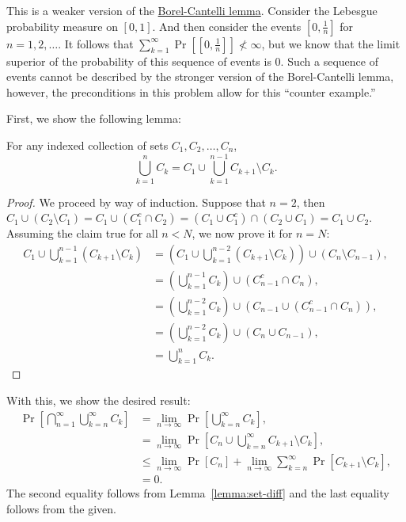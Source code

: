 \begin{solution}
    This is a weaker version of the \href{https://en.wikipedia.org/wiki/Borel-Cantelli_lemma}{Borel-Cantelli lemma}. Consider the Lebesgue probability measure on $[0,1]$. And then consider the events $\left[0,\frac{1}{n}\right]$ for $n = 1,2,\ldots$. It follows that $\sum_{k=1}^\infty \Pr\left[\left[0,\frac{1}{n}\right]\right] \not < \infty$, but we know that the limit superior of the probability of this sequence of events is 0. Such a sequence of events cannot be described by the stronger version of the Borel-Cantelli lemma, however, the preconditions in this problem allow for this ``counter example.''

    First, we show the following lemma:
    \begin{lemma}\label{lemma:set-diff}
        For any indexed collection of sets $C_1,C_2,\ldots,C_n$, \[
            \bigcup_{k=1}^n C_k = C_1 \cup \bigcup_{k=1}^{n-1} C_{k+1} \setminus C_k.  
        \]
    \end{lemma}
    \begin{proof}
        We proceed by way of induction. Suppose that $n=2$, then $C_1 \cup (C_2 \setminus C_1) = C_1 \cup (C_1^c \cap C_2) = (C_1 \cup C_1^c) \cap (C_2 \cup C_1) = C_1 \cup C_2$. Assuming the claim true for all $n < N$, we now prove it for $n=N$:
        \begin{align*}
            C_1 \cup \bigcup_{k=1}^{n-1} (C_{k+1} \setminus C_k) &= \left(C_1 \cup \bigcup_{k=1}^{n-2} (C_{k+1} \setminus C_k)\right)\cup (C_n\setminus C_{n-1}), \\
            &= \left(\bigcup_{k=1}^{n-1} C_k \right) \cup (C_{n-1}^c \cap C_n), \tag{by ind. hyp.}\\
            &= \left(\bigcup_{k=1}^{n-2} C_k\right) \cup \left(C_{n-1} \cup (C_{n-1}^c \cap C_n)\right), \\
            &= \left(\bigcup_{k=1}^{n-2} C_k\right) \cup (C_n \cup C_{n-1}), \\
            &= \bigcup_{k=1}^n C_k.
        \end{align*}
    \end{proof}
    With this, we show the desired result:
    \begin{align*}
        \Pr\left[\bigcap_{n=1}^\infty \bigcup_{k=n}^\infty C_k\right] &= \lim_{n\to\infty} \Pr\left[\bigcup_{k=n}^\infty C_k\right], \\
        &= \lim_{n\to\infty} \Pr\left[C_n \cup \bigcup_{k=n}^\infty C_{k+1} \setminus C_k\right], \\
        &\leq \lim_{n\to\infty} \Pr[C_n] + \lim_{n\to\infty} \sum_{k=n}^\infty \Pr[C_{k+1} \setminus C_k], \\
        &= 0.
    \end{align*}
    The second equality follows from Lemma~\ref{lemma:set-diff} and the last equality follows from the given.
\end{solution}
